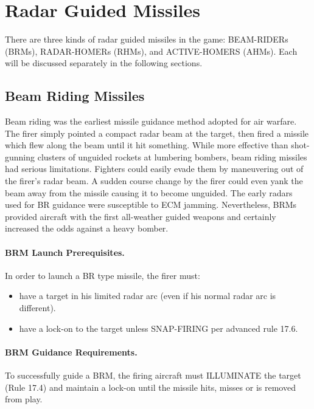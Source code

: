 \section{Radar Guided Missiles}

There are three kinds of radar guided missiles in the game: BEAM-RIDERs (BRMs), RADAR-HOMERs (RHMs), and ACTIVE-HOMERS (AHMs). Each will be discussed separately in the following sections.

\subsection{Beam Riding Missiles}

Beam riding was the earliest missile guidance method adopted for air warfare. The firer simply pointed a compact radar beam at the target, then fired a missile which flew along the beam until it hit something. While more effective than shot-gunning clusters of unguided rockets at lumbering bombers, beam riding missiles had serious limitations. Fighters could easily evade them by maneuvering out of the firer's radar beam. A sudden course change by the firer could even yank the beam away from the missile causing it to become unguided. The early radars used for BR guidance were susceptible to ECM jamming. Nevertheless, BRMs provided aircraft with the first all-weather guided weapons and certainly increased the odds against a heavy bomber.

\paragraph{BRM Launch Prerequisites.} In order to launch a BR type missile, the firer must:

\begin{itemize}

    \item have a target in his limited radar arc (even if his normal radar arc is different).

    \item have a lock-on to the target unless SNAP-FIRING per advanced rule 17.6.

\end{itemize}

\paragraph{BRM Guidance Requirements.} To successfully guide a BRM, the firing aircraft must ILLUMINATE the target (Rule 17.4) and maintain a lock-on until the missile hits, misses or is removed from play.

